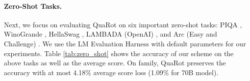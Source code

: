 \begin{table}[t]
    \centering
    \small
    \caption{
    \wiki perplexity results on 4-bit quantization of \llama models with 2048 sequence length. 
    We extract the results for SmoothQuant and OmniQuant results of \citep{omniquant}. 128G shows the group-wise quantization with group size 128.Here, we quantize all weights, activations, and caches in 4-bits in QuaRot.}
    \vspace{0.5em}
    \label{tab:ppl_wikitext2}
\end{table}





\paragraph{Zero-Shot Tasks.} Next, we focus on evaluating QuaRot on six important zero-shot tasks: PIQA \citep{bisk2020piqa}, WinoGrande \citep{sakaguchi2021winogrande}, HellaSwag \citep{zellers2019hellaswag}, LAMBADA (OpenAI) \citep{radford2019language}, and Arc (Easy and Challenge) \citep{Clark2018ThinkYH}. We use the LM Evaluation Harness \citep{gao2021framework} with default parameters for our experiments. Table \ref{tab:zero_shot} shows the accuracy of  our scheme on the above tasks as well as the average score. On \llama family, QuaRot preserves the accuracy with at most 4.18\% average score loss (1.09\% for 70B model).


